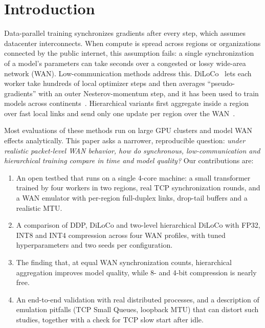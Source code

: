 \documentclass[conference]{IEEEtran}
\begin{document}
\section{Introduction}
Data-parallel training synchronizes gradients after every step, which assumes datacenter interconnects. When compute is spread across regions or organizations connected by the public internet, this assumption fails: a single synchronization of a model's parameters can take seconds over a congested or lossy wide-area network (WAN). Low-communication methods address this. DiLoCo~\cite{diloco} lets each worker take hundreds of local optimizer steps and then averages ``pseudo-gradients'' with an outer Nesterov-momentum step, and it has been used to train models across continents~\cite{opendiloco,intellect1}. Hierarchical variants first aggregate inside a region over fast local links and send only one update per region over the WAN~\cite{halos,lin2020}.

Most evaluations of these methods run on large GPU clusters and model WAN effects analytically. This paper asks a narrower, reproducible question: \emph{under realistic packet-level WAN behavior, how do synchronous, low-communication and hierarchical training compare in time and model quality?} Our contributions are:
\begin{enumerate}
\item An open testbed that runs on a single 4-core machine: a small transformer trained by four workers in two regions, real TCP synchronization rounds, and a WAN emulator with per-region full-duplex links, drop-tail buffers and a realistic MTU.
\item A comparison of DDP, DiLoCo and two-level hierarchical DiLoCo with FP32, INT8 and INT4 compression across four WAN profiles, with tuned hyperparameters and two seeds per configuration.
\item The finding that, at equal WAN synchronization counts, hierarchical aggregation improves model quality, while 8- and 4-bit compression is nearly free.
\item An end-to-end validation with real distributed processes, and a description of emulation pitfalls (TCP Small Queues, loopback MTU) that can distort such studies, together with a check for TCP slow start after idle.
\end{enumerate}
\end{document}
